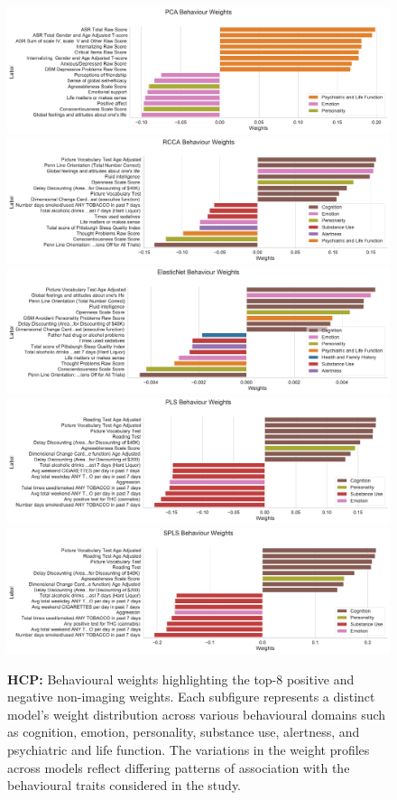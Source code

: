 \begin{figure}[h]
    \centering
    \includegraphics[width=0.8\linewidth]{figures/hcp/PCA behaviour weights}
    \includegraphics[width=0.8\linewidth]{figures/hcp/RCCA behaviour weights}
    \includegraphics[width=0.8\linewidth]{figures/hcp/ElasticNet behaviour weights}
    \includegraphics[width=0.8\linewidth]{figures/hcp/PLS behaviour weights}
    \includegraphics[width=0.8\linewidth]{figures/hcp/SPLS behaviour weights}
    \caption{\textbf{HCP:} Behavioural weights highlighting the top-8 positive and negative non-imaging weights. Each subfigure represents a distinct model's weight distribution across various behavioural domains such as cognition, emotion, personality, substance use, alertness, and psychiatric and life function. The variations in the weight profiles across models reflect differing patterns of association with the behavioural traits considered in the study.}
    \label{fig:behaviour}
\end{figure}

